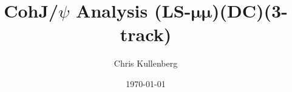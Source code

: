 \title{CohJ/$\psi$ Analysis (\textbf{LS}-$\boldsymbol{\mu\mu}$)(\textbf{DC})(\textbf{3-track})}
\author{Chris Kullenberg}
\date{\today}
